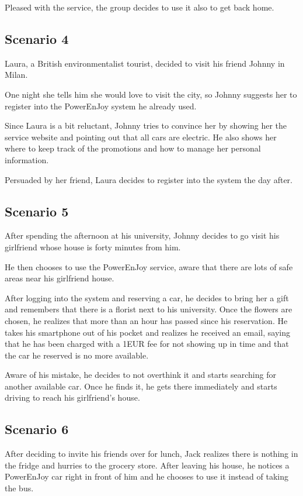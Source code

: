 Pleased with the service, the group decides to use it also to get back home.
\subsection{Scenario 4}
Laura, a British environmentalist tourist, decided to visit his friend Johnny in Milan. 

One night she tells him she would love to visit the city, so Johnny suggests her to register into the PowerEnJoy system he already used.

Since Laura is a bit reluctant, Johnny tries to convince her by showing her the service website and pointing out that all cars are electric. He also shows her where to keep track of the promotions and how to manage her personal information. 

Persuaded by her friend, Laura decides to register into the system the day after.
\subsection{Scenario 5}
After spending the afternoon at his university, Johnny decides to go visit his girlfriend whose house is forty minutes from him. 

He then chooses to use the PowerEnJoy service, aware that there are lots of safe areas near his girlfriend house. 

After logging into the system and reserving a car, he decides to bring her a gift and remembers that there is a florist next to his university. Once the flowers are chosen, he realizes that more than an hour has passed since his reservation. He takes his smartphone out of his pocket and realizes he received an email, saying that he has been charged with a 1EUR fee for not showing up in time and that the car he reserved is no more available. 

Aware of his mistake, he decides to not overthink it and starts searching for another available car. Once he finds it, he gets there immediately and starts driving to reach his girlfriend's house.
\subsection{Scenario 6}
After deciding to invite his friends over for lunch, Jack realizes there is nothing in the fridge and hurries to the grocery store. After leaving his house, he notices a PowerEnJoy car right in front of him and he chooses to use it instead of taking the bus. 

